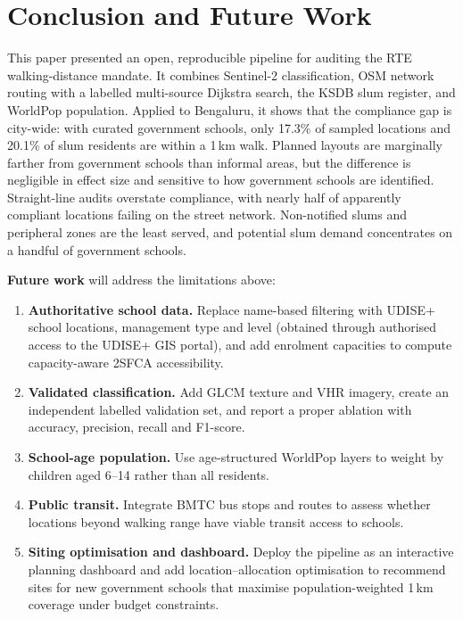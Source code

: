 \documentclass[conference]{IEEEtran}
\newcommand{\km}{\,km}
\begin{document}
\section{Conclusion and Future Work}\label{sec:conclusion}
This paper presented an open, reproducible pipeline for auditing the RTE walking-distance mandate. It combines Sentinel-2 classification, OSM network routing with a labelled multi-source Dijkstra search, the KSDB slum register, and WorldPop population. Applied to Bengaluru, it shows that the compliance gap is city-wide: with curated government schools, only 17.3\% of sampled locations and 20.1\% of slum residents are within a 1\km{} walk. Planned layouts are marginally farther from government schools than informal areas, but the difference is negligible in effect size and sensitive to how government schools are identified. Straight-line audits overstate compliance, with nearly half of apparently compliant locations failing on the street network. Non-notified slums and peripheral zones are the least served, and potential slum demand concentrates on a handful of government schools.

\textbf{Future work} will address the limitations above:
\begin{enumerate}
\item \textbf{Authoritative school data.} Replace name-based filtering with UDISE+ school locations, management type and level (obtained through authorised access to the UDISE+ GIS portal), and add enrolment capacities to compute capacity-aware 2SFCA accessibility.
\item \textbf{Validated classification.} Add GLCM texture \cite{haralick1973} and VHR imagery, create an independent labelled validation set, and report a proper ablation with accuracy, precision, recall and F1-score.
\item \textbf{School-age population.} Use age-structured WorldPop layers to weight by children aged 6--14 rather than all residents.
\item \textbf{Public transit.} Integrate BMTC bus stops and routes to assess whether locations beyond walking range have viable transit access to schools.
\item \textbf{Siting optimisation and dashboard.} Deploy the pipeline as an interactive planning dashboard and add location--allocation optimisation to recommend sites for new government schools that maximise population-weighted 1\km{} coverage under budget constraints.
\end{enumerate}
\end{document}

